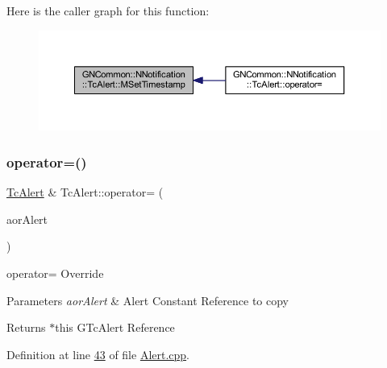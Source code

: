 Here is the caller graph for this function\+:
\nopagebreak
\begin{figure}[H]
\begin{center}
\leavevmode
\includegraphics[width=350pt]{class_g_n_common_1_1_n_notification_1_1_tc_alert_ac6ed25087bcdbb12921d71c2c4126131_icgraph}
\end{center}
\end{figure}
\mbox{\label{class_g_n_common_1_1_n_notification_1_1_tc_alert_ad1371ff2988283b60a47c2879e1a0011}} 
\subsubsection{\texorpdfstring{operator=()}{operator=()}}
{\footnotesize\ttfamily \mbox{\hyperlink{class_g_n_common_1_1_n_notification_1_1_tc_alert}{Tc\+Alert}} \& Tc\+Alert\+::operator= (\begin{DoxyParamCaption}\item[{const \mbox{\hyperlink{class_g_n_common_1_1_n_notification_1_1_tc_alert}{Tc\+Alert}} \&}]{aor\+Alert }\end{DoxyParamCaption})}

operator= Override 
\begin{DoxyParams}{Parameters}
{\em aor\+Alert} & Alert Constant Reference to copy \\
\hline
\end{DoxyParams}
\begin{DoxyReturn}{Returns}
$\ast$this G\+Tc\+Alert Reference 
\end{DoxyReturn}


Definition at line \mbox{\hyperlink{_alert_8cpp_source_l00043}{43}} of file \mbox{\hyperlink{_alert_8cpp_source}{Alert.\+cpp}}.

